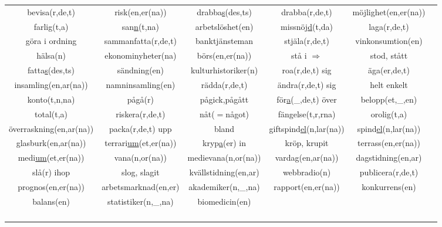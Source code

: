 \begin{center}
\begin{adjustwidth}{-2.6cm}{}
\begin{tabular}{|c c c c c c|}
            bevisa(r,de,t) & risk(en,er(na)) & drabba\underline{s}(des,ts) & drabba(r,de,t) & möjlighet(en,er(na)) &  \\
            farlig(t,a) & san\underline{n}(t,na) & arbetslöshet(en) & missnöj\underline{d}(t,da) & laga(r,de,t) &  \\
            göra i ordning & sammanfatta(r,de,t) & banktjänsteman & stjäla(r,de,t) & vinkonsumtion(en) &  \\
            hälsa(n) & ekonominyheter(na) & börs(en,er(na)) & stå i $\Rightarrow$ & stod, stått &  \\
            fatta\underline{s}(des,ts) & sändning(en) & kulturhistoriker(n) & roa(r,de,t) sig & äga(er,de,t) &  \\
            insamling(en,ar(na)) & namninsamling(en) & rädda(r,de,t) & ändra(r,de,t) sig & helt enkelt &  \\
            konto(t,n,na) & pågå(r) & pågick,pågått & för\underline{a}(\_,de,t) över & belopp(et,\_,en) &  \\
            total(t,a) & riskera(r,de,t) & nåt($=$något) & fängelse(t,r,rna) & orolig(t,a) &  \\
            överraskning(en,ar(na)) & packa(r,de,t) upp & bland & giftspind\underline{el}(n,lar(na)) & spind\underline{el}(n,lar(na)) &  \\
            glasburk(en,ar(na)) & terrari\underline{um}(et,er(na)) & kryp\underline{a}(er) in & kröp, krupit & terrass(en,er(na)) &  \\
            medi\underline{um}(et,er(na)) & vana(n,or(na)) & medievana(n,or(na)) & vardag(en,ar(na)) & dagstidning(en,ar) &  \\
            slå(r) ihop & slog, slagit & kvällstidning(en,ar) & webbradio(n) & publicera(r,de,t) &  \\
            prognos(en,er(na)) & arbetsmarknad(en,er) & akademiker(n,\_,na) & rapport(en,er(na)) & konkurrens(en) &  \\
            balans(en) & statistiker(n,\_,na) & biomedicin(en) &  &  &  \\
             &  &  &  &  &  \\
             &  &  &  &  &  \\
             &  &  &  &  &  \\
             &  &  &  &  &  \\
            \hline
        \end{tabular}
    \end{adjustwidth}
\end{center}

